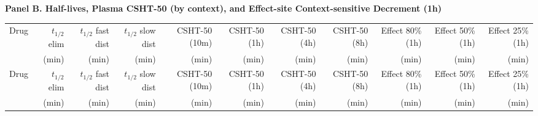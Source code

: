 \documentclass[11pt]{article}
\begin{document}
\vspace{8pt}
\noindent\textbf{Panel B. Half-lives, Plasma CSHT-50 (by context), and Effect-site Context-sensitive Decrement (1h)}

{\small
\begin{longtable}{lrrrrrrrrrr}
\toprule
Drug & $t_{1/2}$ elim & $t_{1/2}$ fast dist & $t_{1/2}$ slow dist & CSHT-50 (10m) & CSHT-50 (1h) & CSHT-50 (4h) & CSHT-50 (8h) & Effect 80\% (1h) & Effect 50\% (1h) & Effect 25\% (1h) \\
 & (min) & (min) & (min) & (min) & (min) & (min) & (min) & (min) & (min) & (min) \\
\midrule
\endfirsthead
\toprule
Drug & $t_{1/2}$ elim & $t_{1/2}$ fast dist & $t_{1/2}$ slow dist & CSHT-50 (10m) & CSHT-50 (1h) & CSHT-50 (4h) & CSHT-50 (8h) & Effect 80\% (1h) & Effect 50\% (1h) & Effect 25\% (1h) \\
 & (min) & (min) & (min) & (min) & (min) & (min) & (min) & (min) & (min) & (min) \\
\midrule
\endhead


\end{longtable}}
\end{document}

